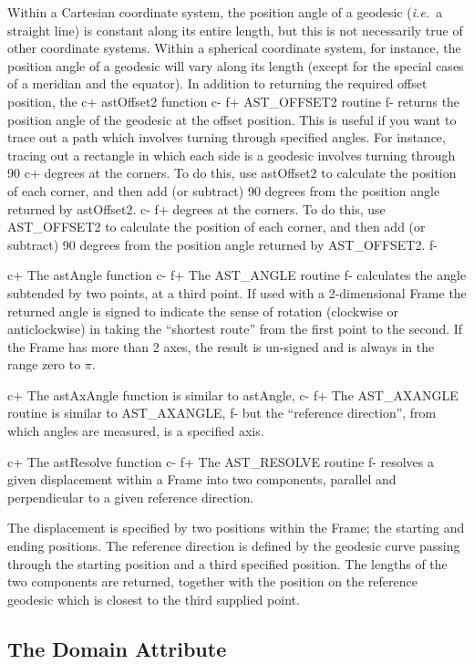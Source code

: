 \documentclass[twoside,11pt]{article}
\begin{document}
Within a Cartesian coordinate system, the position angle of a geodesic
({\em{i.e.}}\ a straight line) is constant along its entire length, but
this is not necessarily true of other coordinate systems. Within a
spherical coordinate system, for instance, the position angle of a geodesic
will vary along its length (except for the special cases of a meridian and
the equator). In addition to returning the required offset position, the 
c+
astOffset2 function 
c-
f+
AST\_OFFSET2 routine
f-
returns the position angle of the geodesic at the
offset position. This is useful if you want to trace out a path which
involves turning through specified angles. For instance, tracing out a
rectangle in which each side is a geodesic involves turning through 90 
c+
degrees at the corners. To do this, use astOffset2 to calculate the
position of each corner, and then add (or subtract) 90 degrees from the 
position angle returned by astOffset2.
c-
f+
degrees at the corners. To do this, use AST\_OFFSET2 to calculate the
position of each corner, and then add (or subtract) 90 degrees from the 
position angle returned by AST\_OFFSET2.
f-

c+
The astAngle function 
c-
f+
The AST\_ANGLE routine 
f-
calculates the angle subtended by two points, at a third point.
If used with a 2-dimensional Frame the returned angle
is signed to indicate the sense of rotation (clockwise or anticlockwise)
in taking the ``shortest route'' from the first point to the second.
If the Frame has more than 2 axes, the result is un-signed and is always
in the range zero to $\pi$. 

c+
The astAxAngle function is similar to astAngle,
c-
f+
The AST\_AXANGLE routine is similar to AST\_AXANGLE,
f-
but the ``reference direction'', from which angles are measured, is 
a specified axis. 

c+
The astResolve function
c-
f+
The AST\_RESOLVE routine
f-
resolves a given displacement within a Frame into two components, parallel and 
perpendicular to a given reference direction. 

The displacement is specified by two positions within the Frame; the
starting and ending positions. The reference direction is defined by the 
geodesic curve passing through the starting position and a third specified
position. The lengths of the two components are returned, together with
the position on the reference geodesic which is closest to the third
supplied point.

\subsection{\label{ss:framedomains}The Domain Attribute}
\end{document}
